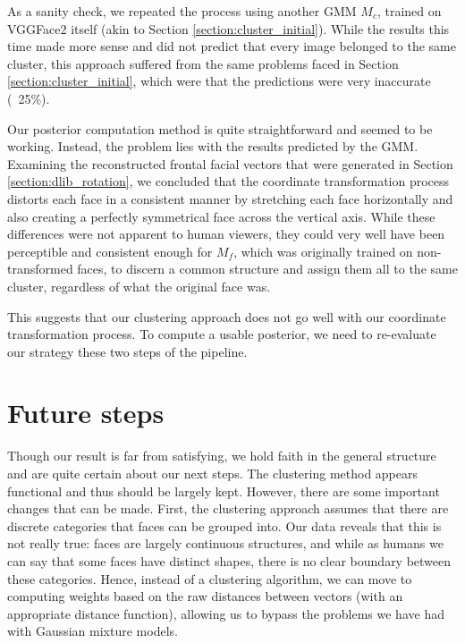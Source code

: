 \documentclass{article}
\begin{document}
As a sanity check, we repeated the process using another GMM $M_c$, trained on
VGGFace2 itself (akin to Section \ref{section:cluster_initial}). While the
results this time made more sense and did not predict that every image belonged
to the same cluster, this approach suffered from the same problems faced in
Section \ref{section:cluster_initial}, which were that the predictions were very
inaccurate (~25\%).

Our posterior computation method is quite straightforward and seemed to be
working. Instead, the problem lies with the results predicted by the GMM.
Examining the reconstructed frontal facial vectors that were generated in
Section \ref{section:dlib_rotation}, we concluded that the coordinate
transformation process distorts each face in a consistent manner by stretching
each face horizontally and also creating a perfectly symmetrical face across the
vertical axis. While these differences were not apparent to human viewers, they
could very well have been perceptible and consistent enough for $M_f$, which was
originally trained on non-transformed faces, to discern a common structure and
assign them all to the same cluster, regardless of what the original face was.

This suggests that our clustering approach does not go well with our coordinate
transformation process. To compute a usable posterior, we need to re-evaluate
our strategy these two steps of the pipeline.


\section{Future steps}

Though our result is far from satisfying, we hold faith in the general structure
and are quite certain about our next steps. The clustering method appears
functional and thus should be largely kept. However, there are some important
changes that can be made. First, the clustering approach assumes that there are
discrete categories that faces can be grouped into. Our data reveals that this
is not really true: faces are largely continuous structures, and while as humans
we can say that some faces have distinct shapes, there is no clear boundary
between these categories. Hence, instead of a clustering algorithm, we can move
to computing weights based on the raw distances between vectors (with an
appropriate distance function), allowing us to bypass the problems we have had
with Gaussian mixture models.
\end{document}
